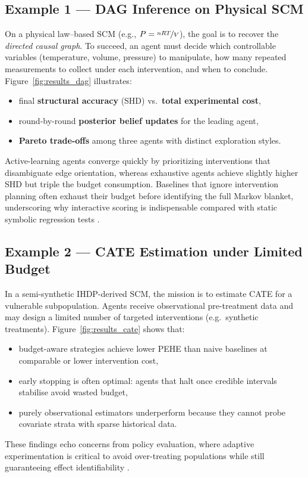 \subsection{Example 1 — DAG Inference on Physical SCM}
On a physical law–based SCM (e.g., $P = \nicefrac{nRT}{V}$), the goal is to recover the \emph{directed causal graph}.  
To succeed, an agent must decide which controllable variables (temperature, volume, pressure) to manipulate, how many repeated measurements to collect under each intervention, and when to conclude.  
Figure~\ref{fig:results_dag} illustrates:
\begin{itemize}
    \item final \textbf{structural accuracy} (SHD) vs.\ \textbf{total experimental cost},
    \item round-by-round \textbf{posterior belief updates} for the leading agent,
    \item \textbf{Pareto trade-offs} among three agents with distinct exploration styles.
\end{itemize}
Active-learning agents converge quickly by prioritizing interventions that disambiguate edge orientation, whereas exhaustive agents achieve slightly higher SHD but triple the budget consumption. Baselines that ignore intervention planning often exhaust their budget before identifying the full Markov blanket, underscoring why interactive scoring is indispensable compared with static symbolic regression tests \citep{la2021contemporary,romano2021pmlb}.

\subsection{Example 2 — CATE Estimation under Limited Budget}
In a semi-synthetic IHDP-derived SCM, the mission is to estimate CATE for a vulnerable subpopulation.  
Agents receive observational pre-treatment data and may design a limited number of targeted interventions (e.g.\ synthetic treatments).  
Figure~\ref{fig:results_cate} shows that:
\begin{itemize}
    \item budget-aware strategies achieve lower PEHE than naive baselines at comparable or lower intervention cost,
    \item early stopping is often optimal: agents that halt once credible intervals stabilise avoid wasted budget,
    \item purely observational estimators underperform because they cannot probe covariate strata with sparse historical data.
\end{itemize}
These findings echo concerns from policy evaluation, where adaptive experimentation is critical to avoid over-treating populations while still guaranteeing effect identifiability \citep{Prosperi2020CausalIAA,Athey2016TheSOA}.

